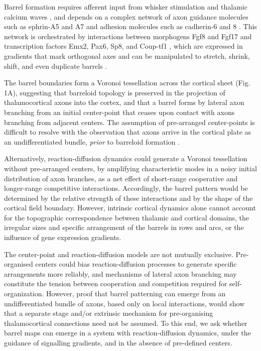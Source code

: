 \documentclass[9pt,lineno]{elife}
\begin{document}
Barrel formation requires afferent input from whisker stimulation and thalamic
calcium waves \citep{anton-bolanos_prenatal_2019}, and depends on a complex
network of axon guidance molecules such as ephrin-A5 and A7 and adhesion
molecules such as cadherin-6 and 8
\citep{vanderhaeghen_mapping_2000,miller_epha7-ephrin-a5_2006}.  This network
is orchestrated by interactions between morphogens Fgf8 and Fgf17 and
transcription factors Emx2, Pax6, Sp8, and Coup-tf1
\citep{shimogori_fibroblast_2005,bishop_regulation_2000}, which are expressed
in gradients that mark orthogonal axes and can be manipulated to stretch,
shrink, shift, and even duplicate barrels
\citep{assimacopoulos_fibroblast_2012}.

The barrel boundaries form a Voronoi tessellation across the cortical sheet
\citep{senft_mouse_1991} (Fig.\,1A), suggesting that barreloid topology is
preserved in the projection of thalamocortical axons into the cortex, and that
a barrel forms by lateral axon branching from an initial center-point that
ceases upon contact with axons branching from adjacent centers.  The
assumption of pre-arranged center-points is difficult to resolve with the
observation that axons arrive in the cortical plate as an undifferentiated
bundle, \emph{prior} to barreloid formation \citep{agmon_organized_1993}.


Alternatively, reaction-diffusion dynamics could generate a Voronoi
tessellation without pre-arranged centers, by amplifying characteristic modes
in a noisy initial distribution of axon branches, as a net effect of
short-range cooperative and longer-range competitive
interactions. Accordingly, the barrel pattern would be determined by the
relative strength of these interactions and by the shape of the cortical field
boundary. However, intrinsic cortical dynamics alone cannot account for the
topographic correspondence between thalamic and cortical domains, the
irregular sizes and specific arrangement of the barrels in rows and arcs, or
the influence of gene expression gradients.

The center-point and reaction-diffusion models are not mutually
exclusive. Pre-organised centers could bias reaction-diffusion processes to
generate specific arrangements more reliably, and mechanisms of lateral axon
branching may constitute the tension between cooperation and competition
required for self-organization. However, proof that barrel patterning can
emerge from an undifferentiated bundle of axons, based only on local
interactions, would show that a separate stage and/or extrinsic mechanism for
pre-organising thalamocortical connections need not be assumed. To this end,
we ask whether barrel maps can emerge in a system with reaction-diffusion
dynamics, under the guidance of signalling gradients, and in the absence of
pre-defined centers.
\end{document}

